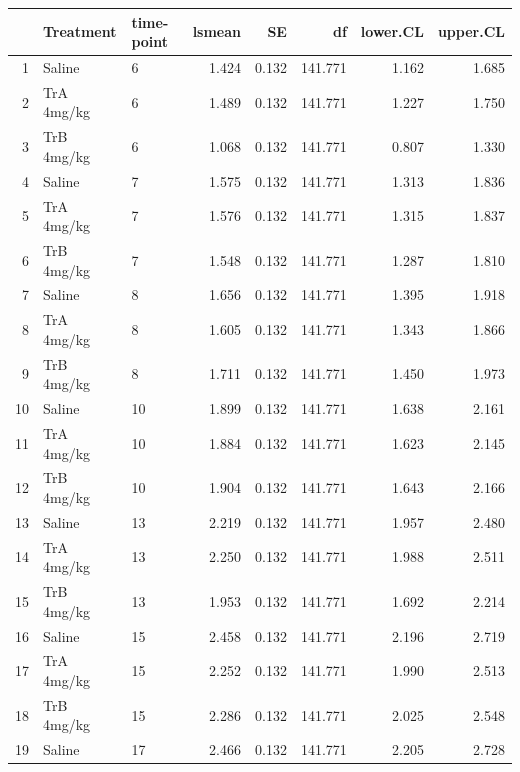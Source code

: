 \newpage
\begin{table}
	\centering
	\begin{tabular}{rllrrrrr}
		\hline
		   & Treatment  & time-point & lsmean & SE    & df      & lower.CL & upper.CL \\
		\hline
		1  & Saline     & 6         & 1.424  & 0.132 & 141.771 & 1.162    & 1.685    \\
		2  & TrA 4mg/kg & 6         & 1.489  & 0.132 & 141.771 & 1.227    & 1.750    \\
		3  & TrB 4mg/kg & 6         & 1.068  & 0.132 & 141.771 & 0.807    & 1.330    \\
		4  & Saline     & 7         & 1.575  & 0.132 & 141.771 & 1.313    & 1.836    \\
		5  & TrA 4mg/kg & 7         & 1.576  & 0.132 & 141.771 & 1.315    & 1.837    \\
		6  & TrB 4mg/kg & 7         & 1.548  & 0.132 & 141.771 & 1.287    & 1.810    \\
		7  & Saline     & 8         & 1.656  & 0.132 & 141.771 & 1.395    & 1.918    \\
		8  & TrA 4mg/kg & 8         & 1.605  & 0.132 & 141.771 & 1.343    & 1.866    \\
		9  & TrB 4mg/kg & 8         & 1.711  & 0.132 & 141.771 & 1.450    & 1.973    \\
		10 & Saline     & 10        & 1.899  & 0.132 & 141.771 & 1.638    & 2.161    \\
		11 & TrA 4mg/kg & 10        & 1.884  & 0.132 & 141.771 & 1.623    & 2.145    \\
		12 & TrB 4mg/kg & 10        & 1.904  & 0.132 & 141.771 & 1.643    & 2.166    \\
		13 & Saline     & 13        & 2.219  & 0.132 & 141.771 & 1.957    & 2.480    \\
		14 & TrA 4mg/kg & 13        & 2.250  & 0.132 & 141.771 & 1.988    & 2.511    \\
		15 & TrB 4mg/kg & 13        & 1.953  & 0.132 & 141.771 & 1.692    & 2.214    \\
		16 & Saline     & 15        & 2.458  & 0.132 & 141.771 & 2.196    & 2.719    \\
		17 & TrA 4mg/kg & 15        & 2.252  & 0.132 & 141.771 & 1.990    & 2.513    \\
		18 & TrB 4mg/kg & 15        & 2.286  & 0.132 & 141.771 & 2.025    & 2.548    \\
		19 & Saline     & 17        & 2.466  & 0.132 & 141.771 & 2.205    & 2.728    \\

\end{tabular}
\end{table}
